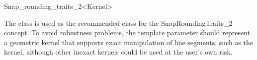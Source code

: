 
\ccRefPageBegin


\begin {ccRefClass} {Snap_rounding_traits_2<Kernel>}
    

The class  is used as the recommended
class for the SnapRoundingTraits\_2 concept. To avoid robustness problems,
the template parameter should represent a geometric kernel that supports
exact manipulation of line segments, such as the
 kernel, although other inexact kernels could be
used at the user's own risk.

 
\ccIsModel
    \\
 
\end{ccRefClass} %
\ccRefPageEnd
